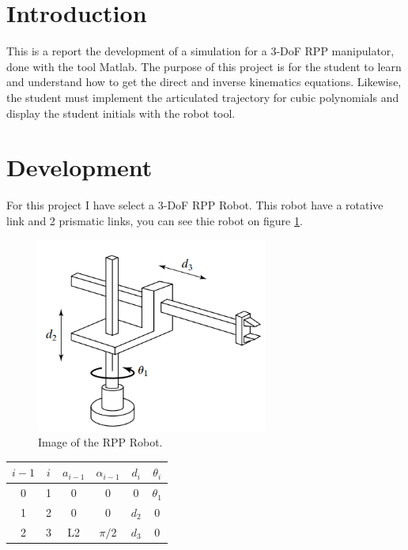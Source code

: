 \documentclass[12pt]{article}
\begin{document}
    \section{Introduction}
    This is a report the development of a simulation for a 3-DoF RPP manipulator, done with the tool Matlab.
    The purpose of this project is for the student to learn and understand how to get the direct and inverse kinematics equations.
    Likewise, the student must implement the articulated trajectory for cubic polynomials and display the student initials with the robot tool.
    
    \section{Development}
    For this project I have select a 3-DoF RPP Robot. This robot have a rotative link and 2 prismatic links, you can
    see thie robot on figure \ref{fig:robot}.
    \begin{figure}[h]
        \centering
        \includegraphics[width = 3in]{RPP.png}
        \caption{Image of the RPP Robot.}
        \label{fig:robot}
    \end{figure}

    \begin{table}[h]
        \begin{center}
            \begin{tabular}{c c c c c c}
                \hline
                $i-1$ & $i$ & $a_{i-1}$ & $\alpha_{i-1}$ & $d_i$ & $\theta_i$\\
                \hline
                0 & 1 & 0 & 0 & 0 & $\theta_1$\\
                1 & 2 & 0 & 0 & $d_2$ & 0\\
                2 & 3 & L2 & $\pi / 2$ & $d_3$ & 0\\
                \hline
            \end{tabular}
        \end{center}
        \label{table:DH_table}
    \end{table}
\end{document}
